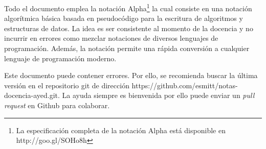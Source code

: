Todo el documento emplea la notación Alpha\footnote{La especificación completa de la notación Alpha está disponible en http://goo.gl/SOHo8h} la cual consiste en una notación algorítmica básica basada en pseudocódigo para la escritura de algoritmos y estructuras de datos. La idea es ser consistente al momento de la docencia y no incurrir en errores como mezclar notaciones de diversos lenguajes de programación. Además, la notación permite una rápida conversión a cualquier lenguaje de programación moderno.

Este documento puede contener errores. Por ello, se recomienda buscar la última versión en el repositorio git de dirección https://github.com/esmitt/notas-docencia-ayed.git. La ayuda siempre es bienvenida por ello puede enviar un \textit{pull request} en Github para colaborar.